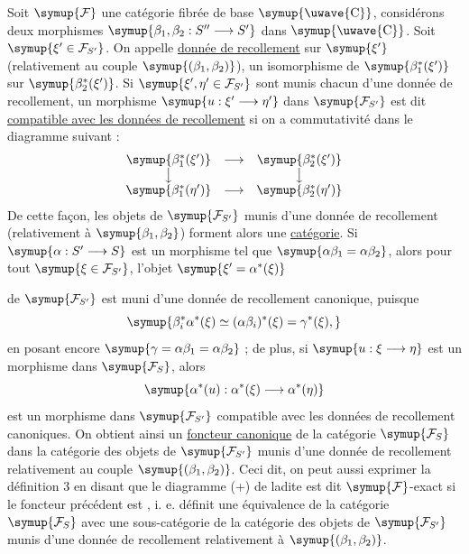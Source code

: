  Soit $\symup{\mathcal F}$ une catégorie fibrée de base
$\symup{\text{\uwave{C}}}$, considérons deux morphismes $\symup{\beta_1,\beta_2:S''\longrightarrow S'}$ dans $\symup{\text{\uwave{C}}}$. Soit
$\symup{\xi'\in\mathcal F_{S'}}$. On appelle \uline{donnée de recollement} sur $\symup{\xi'}$
(relativement au couple $\symup{(\beta_1,\beta_2)}$), un isomorphisme de
$\symup{\beta_1^*(\xi')}$ sur $\symup{\beta_2^*(\xi')}$. Si $\symup{\xi',\eta'\in\mathcal F_{S'}}$
sont munis chacun d'une donnée de recollement, un morphisme
$\symup{u:\xi'\longrightarrow\eta'}$ dans $\symup{\mathcal F_{S'}}$ est dit
\uline{compatible avec les données de recollement} si on a commutativité dans
le diagramme suivant :
\[
\begin{array}{ccc}
  \symup{\beta_1^*(\xi')} & \longrightarrow & \symup{\beta_2^*(\xi')} \\
  \big\downarrow && \big\downarrow \\
  \symup{\beta_1^*(\eta')} & \longrightarrow & \symup{\beta_2^*(\eta')}
\end{array}
\]
De cette façon, les objets de $\symup{\mathcal F_{S'}}$ munis d'une donnée de
recollement (relativement à $\symup{\beta_1,\beta_2}$) forment alors une \uline{catégorie}. Si
$\symup{\alpha:S'\longrightarrow S}$ est un morphisme tel que
$\symup{\alpha\beta_1=\alpha\beta_2}$, alors pour tout $\symup{\xi\in\mathcal F_{S'}}$, l'objet
$\symup{\xi'=\alpha^*(\xi)}$

de $\symup{\mathcal F_{S'}}$ est muni d'une donnée de recollement canonique, puisque
\[
  \symup{\beta_i^*\alpha^*(\xi)\simeq(\alpha\beta_i)^*(\xi)=\gamma^*(\xi),}
\]
en posant encore $\symup{\gamma=\alpha\beta_1=\alpha\beta_2}$ ; de plus, si
$\symup{u:\xi\longrightarrow\eta}$ est un morphisme dans $\symup{\mathcal F_S}$, alors
\[
  \symup{\alpha^*(u):\alpha^*(\xi)\longrightarrow\alpha^*(\eta)}
\]
est un morphisme dans $\symup{\mathcal F_{S'}}$ compatible avec les données de
recollement canoniques. On obtient ainsi un \uline{foncteur canonique} de la catégorie
$\symup{\mathcal F_S}$ dans la catégorie des objets de $\symup{\mathcal F_{S'}}$ munis d'une
donnée de recollement relativement au couple $\symup{(\beta_1,\beta_2)}$. Ceci dit, on
peut aussi exprimer la définition 3 en disant que le diagramme (+) de ladite est dit $\symup{\mathcal F}$-exact si le foncteur précédent est , i. e. définit une équivalence de la catégorie $\symup{\mathcal F_S}$ avec une
sous-catégorie de la catégorie des objets de $\symup{\mathcal F_{S'}}$ munis d'une
donnée de recollement relativement à $\symup{(\beta_1,\beta_2)}$.

